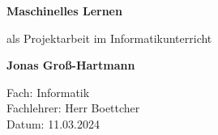 \begin{titlepage}
    \begin{center}
        \vspace*{1cm}
            
        \Huge
        \textbf{Maschinelles Lernen}
            
        \vspace{0.5cm}
        \LARGE
        als Projektarbeit im Informatikunterricht
            
        \vspace{1.5cm}
            
        \textbf{Jonas Groß-Hartmann}
            
        \vfill
        
        \Large
        Fach: Informatik\\
        Fachlehrer: Herr Boettcher\\
        Datum: 11.03.2024
            
    \end{center}
\end{titlepage}